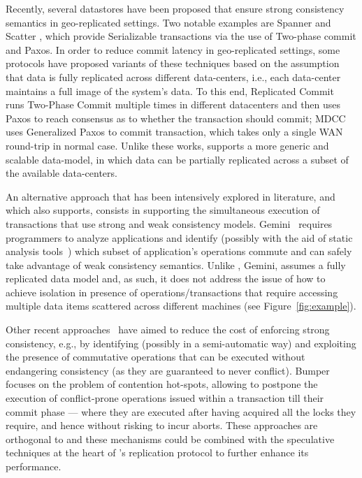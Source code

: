 \iffalse
Recently, several datastores have been proposed that ensure strong consistency semantics in geo-replicated settings. Two notable examples are Spanner \cite{spanner} and Scatter \cite{scatter}, which provide Serializable transactions via the use of Two-phase commit and Paxos. In order to reduce commit latency in geo-replicated settings, some protocols have proposed variants of these techniques based on the assumption that data is fully replicated across different data-centers, i.e., each data-center maintains a full image of the system's data. To this end, Replicated Commit~\cite{mahmoud2013low} runs Two-Phase Commit multiple times in different datacenters and then uses Paxos to reach consensus as to whether the transaction should commit; MDCC~\cite{kraska2013mdcc} uses Generalized Paxos \cite{lamport2005generalized} to commit transaction, which takes only a single WAN round-trip in normal case. Unlike these works, \specula supports a more generic and scalable data-model, in which data can be partially replicated across a subset of the available data-centers.

An alternative approach that has been intensively explored in literature, and which also \specula supports, consists in supporting the simultaneous execution of transactions that use strong and weak consistency models. Gemini~\cite{li2012making} requires programmers to analyze applications and identify (possibly with the aid of static analysis tools~\cite{atc-rodrigo}) which subset of application's operations commute and can safely take advantage of weak consistency semantics.  Unlike \specula, Gemini, assumes a fully replicated data model and, as such, it does not address the issue of how to achieve isolation in presence of operations/transactions that require accessing  multiple data items scattered across different machines (see Figure~\ref{fig:example}).

Other recent approaches~\cite{zhang2013transaction,SwiftCloud,Walter} have aimed to reduce the cost of enforcing strong consistency, e.g., by identifying (possibly in a semi-automatic way) and exploiting the presence of commutative operations that can be executed without endangering consistency (as they are guaranteed to never conflict). Bumper~\cite{Diegues2013SRDS}  focuses on the problem of contention hot-spots, allowing to postpone the execution of conflict-prone operations issued within a transaction till their commit phase --- where they are executed after having acquired all the locks they require, and hence without risking to incur aborts. These approaches are orthogonal to \specula and  these mechanisms  could be combined with the speculative techniques  at the heart of \specula's replication protocol to further enhance its performance.


